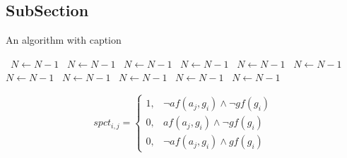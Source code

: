 \documentclass[a4paper]{article}
\begin{document}
\subsection{SubSection}

\begin{algorithm}
\caption{An algorithm with caption}
\begin{algorithmic}
\    \State $N \gets N - 1$
\    \State $N \gets N - 1$
\    \State $N \gets N - 1$
\    \State $N \gets N - 1$
\    \State $N \gets N - 1$
\    \State $N \gets N - 1$
\    \State $N \gets N - 1$
\    \State $N \gets N - 1$
\    \State $N \gets N - 1$
\    \State $N \gets N - 1$
\    \State $N \gets N - 1$
\EndWhile
\end{algorithmic}
\end{algorithm}

\begin{equation}
spct_{i,j} =
\begin{cases}
1, & \text{$\neg af(a_j,g_i) \wedge \neg gf(g_i)$}\\
0, & \text{$af(a_j,g_i) \wedge \neg gf(g_i)$}\\
0, & \text{$\neg af(a_j,g_i) \wedge gf(g_i)$}
\end{cases}
\end{equation}
\end{document}
